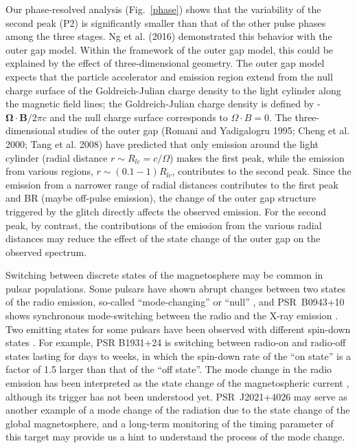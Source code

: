 \documentclass[12pt,preprint]{aastex}
\begin{document}
Our phase-resolved  analysis (Fig.~\ref{phase}) shows that
the variability of the second peak (P2) is significantly smaller
than that of the other pulse phases among the three stages.
Ng et al. (2016) demonstrated this behavior with the outer gap model. 
Within the framework of the outer gap model, this could be explained by
the effect of three-dimensional geometry.  The outer gap  model expects that the particle accelerator
and emission region  extend from the null charge surface of the Goldreich-Julian charge density to
the light cylinder along the magnetic field lines; the Goldreich-Julian charge density is defined by -$\mathbf{\Omega}\cdot \mathbf{B}/2\pi c$ \citep{gol69} and the null charge surface corresponds to $\Omega\cdot B=0$. The three-dimensional
studies of the outer gap (Romani and   Yadigalogru 1995; Cheng et al. 2000; Tang et al. 2008)
have predicted that only emission around the light cylinder (radial distance
$r\sim R_{lc}=c/\Omega$) makes  the first peak, while  the
emission from various   regions, $r\sim (0.1-1)R_{lc}$, contributes to the second peak. 
 Since the emission from a narrower range of  radial distances
 contributes to the first peak and BR (maybe off-pulse emission), the change of the outer gap structure
  triggered by the glitch   directly  affects  the observed emission.  For the second peak, by contrast,  
the contributions of the emission from the various radial distances may reduce the effect of the state change of the
outer gap on the observed spectrum.


Switching between discrete states of the magnetosphere may be common in  pulsar populations. 
Some pulsars have shown abrupt changes between two states of the radio emission, so-called ``mode-changing'' or ``null'' \citep{wan07}, and PSR~B0943+10
shows synchronous mode-switching between the radio and the X-ray emission \citep{her13, mer16}. 
Two emitting states for some pulsars have been observed with different spin-down states \citep{kra06,lyn10}.
For example, PSR B1931+24 is switching between radio-on and radio-off states lasting for days to weeks, in which the spin-down rate of the ``on state'' is
a factor of 1.5 larger than that of the ``off state''. 
The mode change in the radio emission has been interpreted as the state change of the magnetospheric current \citep{kra06}, although its trigger has not been understood yet.
PSR~J2021+4026 may serve as  another example of  a mode change of the radiation due to the state change of the global magnetosphere, and a long-term monitoring of the timing parameter of this target may provide us a hint to understand the process of the mode change. 
\end{document}
